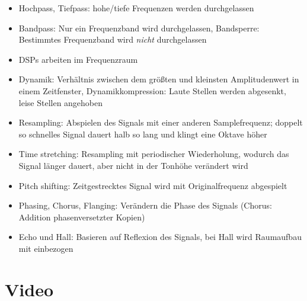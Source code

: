 \documentclass[12pt,landscape]{article}
\begin{document}
\begin{multicols}{3}
\begin{itemize}
\item Hochpass, Tiefpass: hohe/tiefe Frequenzen werden durchgelassen
\item Bandpass: Nur ein Frequenzband wird durchgelassen, Bandsperre: Bestimmtes Frequenzband wird \textit{nicht} durchgelassen
\item DSPs arbeiten im Frequenzraum
\item Dynamik: Verhältnis zwischen dem größten und kleinsten Amplitudenwert in einem Zeitfenster, Dynamikkompression: Laute Stellen werden abgesenkt, leise Stellen angehoben
\item Resampling: Abspielen des Signals mit einer anderen Samplefrequenz; doppelt so schnelles Signal dauert halb so lang und klingt eine Oktave höher
\item Time stretching: Resampling mit periodischer Wiederholung, wodurch das Signal länger dauert, aber nicht in der Tonhöhe verändert wird
\item Pitch shifting: Zeitgestrecktes Signal wird mit Originalfrequenz abgespielt
\item Phasing, Chorus, Flanging: Verändern die Phase des Signals (Chorus: Addition phasenversetzter Kopien)
\item Echo und Hall: Basieren auf Reflexion des Signals, bei Hall wird Raumaufbau mit einbezogen
\end{itemize}
\section{Video}

\end{multicols}
\end{document}
